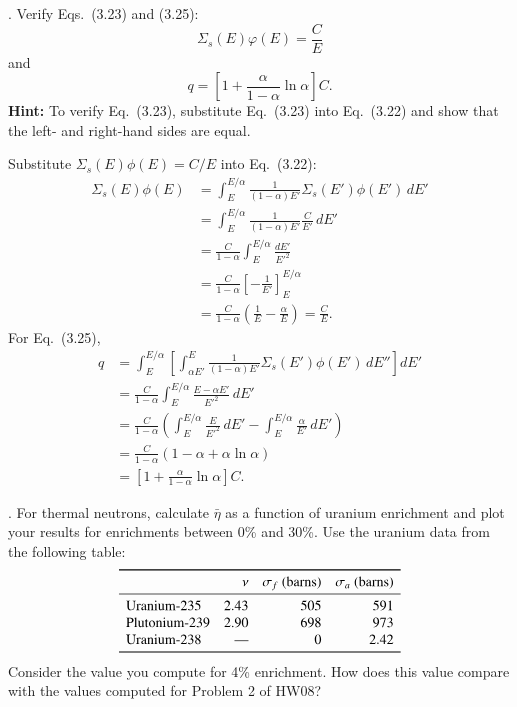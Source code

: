 
. Verify Eqs.~(3.23) and (3.25):
\[
 \Sigma_s(E)\varphi(E)=\frac{C}{E}
 \tag{FNRP 3.23}
\]
and
\[
 q=\left[1+\frac{\alpha}{1-\alpha}\ln\alpha\right]C.
 \tag{FNRP 3.25}
\]
\textbf{Hint:} To verify Eq.~(3.23), substitute Eq.~(3.23) into Eq.~(3.22)
and show that the left- and right-hand sides are equal.

\begin{adaptedsolution}
Substitute $\Sigma_s(E)\phi(E)=C/E$ into Eq.~(3.22):
\begin{align*}
 \Sigma_s(E)\phi(E)
 &=\int_E^{E/\alpha}
   \frac{1}{(1-\alpha)E'}\Sigma_s(E')\phi(E')\,dE'\\
 &=\int_E^{E/\alpha}\frac{1}{(1-\alpha)E'}\frac{C}{E'}\,dE'\\
 &=\frac{C}{1-\alpha}\int_E^{E/\alpha}\frac{dE'}{E'^2}\\
 &=\frac{C}{1-\alpha}\left[-\frac{1}{E'}\right]_E^{E/\alpha}\\
 &=\frac{C}{1-\alpha}\left(\frac{1}{E}-\frac{\alpha}{E}\right)
  =\boxed{\frac{C}{E}}.
\end{align*}
For Eq.~(3.25),
\begin{align*}
 q
 &=\int_E^{E/\alpha}
   \left[\int_{\alpha E'}^E
   \frac{1}{(1-\alpha)E'}\Sigma_s(E')\phi(E')\,dE''\right]dE'\\
 &=\frac{C}{1-\alpha}\int_E^{E/\alpha}
   \frac{E-\alpha E'}{E'^2}\,dE'\\
 &=\frac{C}{1-\alpha}
   \left(\int_E^{E/\alpha}\frac{E}{E'^2}\,dE'
         -\int_E^{E/\alpha}\frac{\alpha}{E'}\,dE'\right)\\
 &=\frac{C}{1-\alpha}\left(1-\alpha+\alpha\ln\alpha\right)\\
 &=\boxed{\left[1+\frac{\alpha}{1-\alpha}\ln\alpha\right]C}.
\end{align*}
\end{adaptedsolution}

\newpage

. For thermal neutrons, calculate $\bar{\eta}$ as a
function of uranium enrichment and plot your results for enrichments between
0\% and 30\%. Use the uranium data from the following table:
\[
\begin{array}{lrrr}
\toprule
 & \nu & \sigma_f~(\mathrm{barns}) & \sigma_a~(\mathrm{barns})\\
\midrule
\text{Uranium-235} & 2.43 & 505 & 591\\
\text{Plutonium-239} & 2.90 & 698 & 973\\
\text{Uranium-238} & \text{---} & 0 & 2.42\\
\bottomrule
\end{array}
\]
Consider the value you compute for 4\% enrichment. How does this value compare
with the values computed for Problem 2 of HW08?

